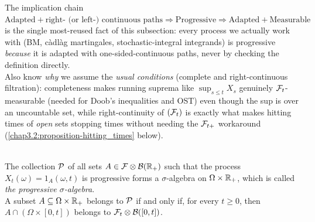 \begin{quizbox}
The implication chain $\text{Adapted}+\text{right- (or left-) continuous paths} \Rightarrow \text{Progressive} \Rightarrow \text{Adapted}+\text{Measurable}$ is the single most-reused fact of this subsection: every process we actually work with (BM, càdlàg martingales, stochastic-integral integrands) is progressive \emph{because} it is adapted with one-sided-continuous paths, never by checking the definition directly. \\
Also know \emph{why} we assume the \textit{usual conditions} (complete and right-continuous filtration): completeness makes running suprema like $\sup_{s\le t}X_s$ genuinely $\mathcal{F}_t$-measurable (needed for Doob's inequalities and OST) even though the sup is over an uncountable set, while right-continuity of $(\mathcal{F}_t)$ is exactly what makes hitting times of \emph{open} sets stopping times without needing the $\mathcal{F}_{t+}$ workaround (\cref{chap3.2:proposition-hitting_times} below).
\end{quizbox}

\begin{proposition} \label{chap3.1:proposition-progressive_sigma_algebra}
 \\
The collection $\mathcal{P}$ of all sets $A \in \mathcal{F} \otimes \mathcal{B}(\mathbb{R}_+)$ such that the process $X_t(\omega)=1_A(\omega,t)$ is progressive forms a $\sigma$-algebra on $\Omega \times \mathbb{R}_+$, which is called \textit{the progressive $\sigma$-algebra}. \\
A subset $A \subseteq \Omega \times \mathbb{R}_+$ belongs to $\mathcal{P}$ if and only if, for every $t \geq 0$, then $A \cap (\Omega \times [0,t])$ belongs to $\mathcal{F}_t \otimes \mathcal{B}([0,t])$.
\end{proposition}

